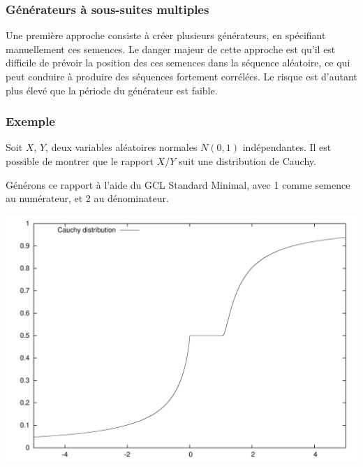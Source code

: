 \documentclass[t,usepdftitle=false]{beamer}
\begin{document}
\begin{frame}
\frametitle{Générateurs à sous-suites multiples}

Une première approche consiste à créer plusieurs générateurs, en
spécifiant manuellement ces semences.
Le danger majeur de cette approche est qu'il est difficile de prévoir
la position des ces semences dans la séquence aléatoire, ce qui peut
conduire à produire des séquences fortement corrélées.
Le risque est d'autant plus élevé que la période du générateur est faible.

\end{frame}

\begin{frame} 
\frametitle{Exemple}

Soit $X$, $Y$, deux variables aléatoires normales $N(0,1)$ indépendantes.
Il est possible de montrer que le rapport $X/Y$ suit une distribution
de Cauchy.

\mbox{}

Générons ce rapport à l'aide du GCL Standard Minimal, avec 1 comme semence au
numérateur, et 2 au dénominateur.\\
\begin{center}
\includegraphics[width=0.5\linewidth]{cauchy_bad.pdf}
\end{center}

\end{frame}
\end{document}
